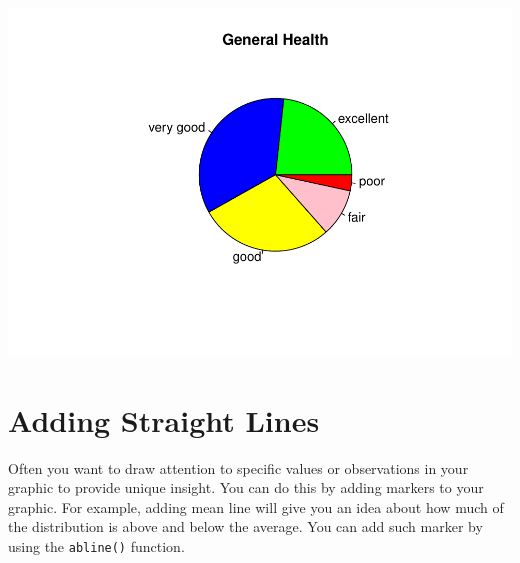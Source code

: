 \documentclass[
]{book}
\newenvironment{Shaded}{\begin{snugshade}}{\end{snugshade}}
\newcommand{\CommentTok}[1]{\textcolor[rgb]{0.56,0.35,0.01}{\textit{#1}}}
\newcommand{\DataTypeTok}[1]{\textcolor[rgb]{0.13,0.29,0.53}{#1}}
\newcommand{\DecValTok}[1]{\textcolor[rgb]{0.00,0.00,0.81}{#1}}
\newcommand{\KeywordTok}[1]{\textcolor[rgb]{0.13,0.29,0.53}{\textbf{#1}}}
\newcommand{\NormalTok}[1]{#1}
\newcommand{\OperatorTok}[1]{\textcolor[rgb]{0.81,0.36,0.00}{\textbf{#1}}}
\newcommand{\StringTok}[1]{\textcolor[rgb]{0.31,0.60,0.02}{#1}}
\begin{document}
\includegraphics{_main_files/figure-latex/unnamed-chunk-182-1.pdf}

\hypertarget{adding-straight-lines}{%
\section{Adding Straight Lines}\label{adding-straight-lines}}

Often you want to draw attention to specific values or observations in your graphic to provide unique insight. You can do this by adding markers to your graphic. For example, adding mean line will give you an idea about how much of the distribution is above and below the average. You can add such marker by using the \texttt{abline()} function.

\begin{Shaded}
\end{Shaded}
\end{document}
